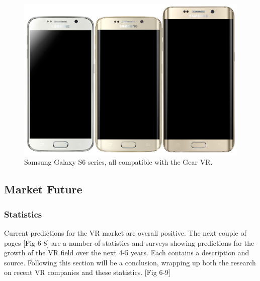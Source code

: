\documentclass[a4paper,10pt]{article}
\begin{document}
\begin{figure}[H]
	\centerline{\includegraphics[width=\linewidth,height=\paperheight,keepaspectratio]{galaxy5.png}}
	\caption{Samsung Galaxy S6 series, all compatible with the Gear VR.}
	\label{fig:samsungGalaxy}
\end{figure}

\subsection{Market Future}
\subsubsection{Statistics}

Current predictions for the VR market are overall positive.  The next couple of pages [Fig 6-8] are a number of statistics and surveys showing predictions for the growth of the VR field over the next 4-5 years.  Each contains a description and source.  Following this section will be a conclusion, wrapping up both the research on recent VR companies and these statistics. [Fig 6-9]
\end{document}
